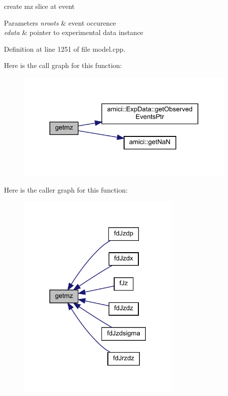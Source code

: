 create mz slice at event 
\begin{DoxyParams}{Parameters}
{\em nroots} & event occurence \\
\hline
{\em edata} & pointer to experimental data instance \\
\hline
\end{DoxyParams}


Definition at line 1251 of file model.\+cpp.

Here is the call graph for this function\+:
\nopagebreak
\begin{figure}[H]
\begin{center}
\leavevmode
\includegraphics[width=305pt]{classamici_1_1_model_a523a7d80e06bfab324d566dd6032abcf_cgraph}
\end{center}
\end{figure}
Here is the caller graph for this function\+:
\nopagebreak
\begin{figure}[H]
\begin{center}
\leavevmode
\includegraphics[width=226pt]{classamici_1_1_model_a523a7d80e06bfab324d566dd6032abcf_icgraph}
\end{center}
\end{figure}
\mbox{\label{classamici_1_1_model_aee6c7b534a091180c01aabb3be44a216}} 
